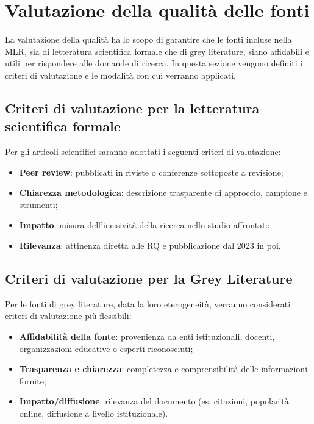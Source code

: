\documentclass[a4paper,9pt]{article}
\begin{document}
	
\section{Valutazione della qualità delle fonti}

La valutazione della qualità ha lo scopo di garantire che le fonti incluse nella MLR, sia di letteratura scientifica formale che di grey literature, siano affidabili e utili per rispondere alle domande di ricerca. In questa sezione vengono definiti i criteri di valutazione e le modalità con cui verranno applicati.

\subsection{Criteri di valutazione per la letteratura scientifica formale}

Per gli articoli scientifici saranno adottati i seguenti criteri di valutazione:
\begin{itemize}
	\item \textbf{Peer review}: pubblicati in riviste o conferenze sottoposte a revisione;
	\item \textbf{Chiarezza metodologica}: descrizione trasparente di approccio, campione e strumenti;
	\item \textbf{Impatto}: misura dell'incisività della ricerca nello studio affrontato; 
	\item \textbf{Rilevanza}: attinenza diretta alle RQ e pubblicazione dal 2023 in poi.
\end{itemize}

\subsection{Criteri di valutazione per la Grey Literature}

Per le fonti di grey literature, data la loro eterogeneità, verranno considerati criteri di valutazione più flessibili:
\begin{itemize}
	\item \textbf{Affidabilità della fonte}: provenienza da enti istituzionali, docenti, organizzazioni educative o esperti riconosciuti;
	\item \textbf{Trasparenza e chiarezza}: completezza e comprensibilità delle informazioni fornite;
	\item \textbf{Impatto/diffusione}: rilevanza del documento (es. citazioni, popolarità online, diffusione a livello istituzionale).
\end{itemize}
\end{document}
